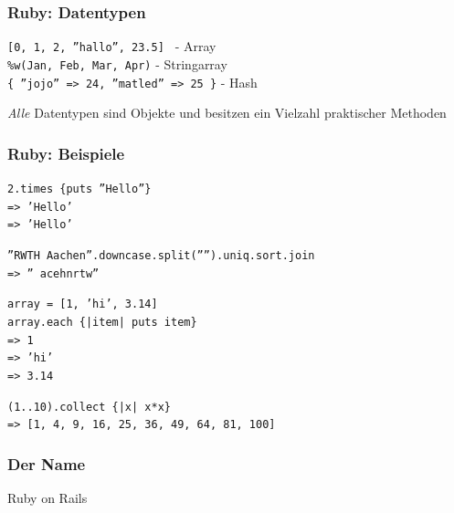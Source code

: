 \begin{frame}
  \frametitle{Ruby: Datentypen}
  { \tt \small [0, 1, 2, ''hallo'', 23.5] } - Array \\
  { \tt \small \%w(Jan, Feb, Mar, Apr)} - Stringarray \\
  { \tt \small \{ ''jojo'' => 24, ''matled'' => 25 \}} - Hash \\
  \vspace{0.3cm}
  \begin{center}
    \emph{Alle} Datentypen sind Objekte und besitzen ein Vielzahl praktischer Methoden
  \end{center}
\end{frame}

\begin{frame}
  \frametitle{Ruby: Beispiele}
  {\tt \small 2.times \{puts ''Hello''\}} \\
  {\tt \small {\color{green}=> 'Hello'}} \\
  {\tt \small {\color{green}=> 'Hello'}}
  \vspace{0.5cm}
  \pause

  {\tt \small ''RWTH Aachen''.downcase.split('''').uniq.sort.join} \\
  {\tt \small  {\color{green}=> '' acehnrtw''}} \\
  \vspace{0.5cm}
  \pause

  {\tt \small array = [1, 'hi', 3.14]} \\
  {\tt \small array.each \{|item| puts item\}} \\
  {\tt \small {\color{green}=> 1}} \\
  {\tt \small {\color{green}=> 'hi'}} \\
  {\tt \small {\color{green}=> 3.14}}
  \vspace{0.5cm}
  \pause

  {\tt \small (1..10).collect \{|x| x*x\}} \\
  {\tt \small {\color{green}=> [1, 4, 9, 16, 25, 36, 49, 64, 81, 100]}}
\end{frame}

\begin{frame}
  \frametitle{Der Name}
  \begin{center}
    \Huge Ruby {\color{red}on Rails}
  \end{center}
\end{frame}


